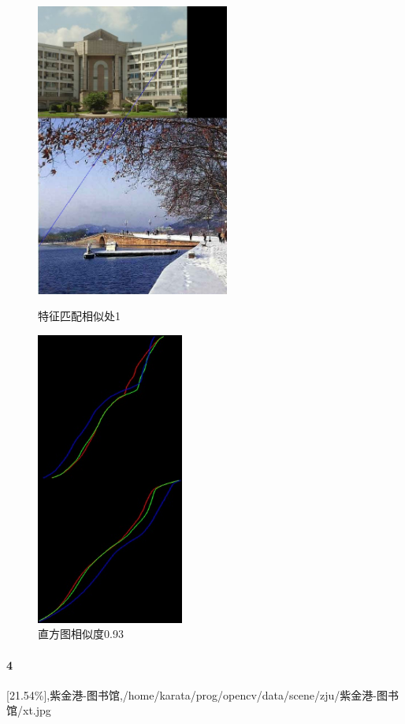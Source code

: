 \begin{figure}[htb]
\begin{minipage}[t]{0.5\linewidth}
\centering
\includegraphics[height=3.8in]{玉泉曹楼.jpg.d/im3sift.jpg}
\caption{特征匹配相似处1}
\label{fig:side:a}
\end{minipage}%
\begin{minipage}[t]{0.5\linewidth}
\centering
\includegraphics[height=3.8in]{玉泉曹楼.jpg.d/im3hist2.jpg}
\caption{直方图相似度0.93}
\label{fig:side:a}
\end{minipage}%
\end{figure}

\clearpage
\paragraph{4}
[21.54\%],紫金港-图书馆,/home/karata/prog/opencv/data/scene/zju/紫金港-图书馆/xt.jpg

